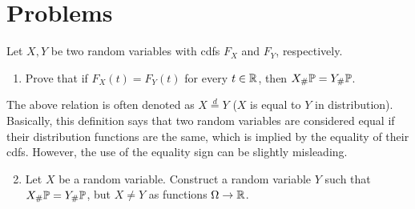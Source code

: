 \section{Problems}

\begin{problem}
Let $X,Y$ be two random variables with cdfs $F_X$ and $F_Y$, respectively. 
\begin{enumerate}[label=(\alph*)]
\item Prove that if $F_X(t) = F_Y(t)$ for every $t \in \mathbb R$, then $X_\# \mathbb P = Y_\# \mathbb P$. 
\end{enumerate}
The above relation is often denoted as $X \stackrel{d}{=} Y$ ($X$ is equal to $Y$ in distribution). Basically, this definition says that two random variables are considered equal if their distribution functions are the same, which is implied by the equality of their cdfs. However, the use of the equality sign can be slightly misleading.
\begin{enumerate}
\setcounter{enumi}{1}
\item Let $X$ be a random variable. Construct a random variable $Y$ such that $X_\# \mathbb P = Y_\# \mathbb P$, but $X \ne Y$ as functions $\Omega \to \mathbb R$.
\end{enumerate}
\end{problem}

